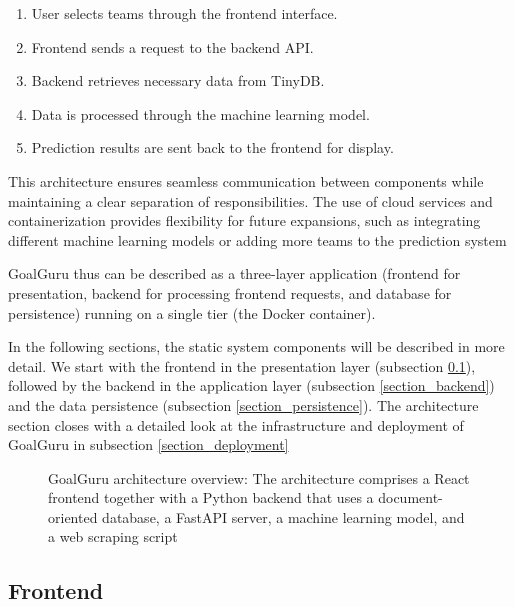 \documentclass[conference,a4paper,flushend]{cs-techrep}
\begin{document}
\begin{enumerate}
\item User selects teams through the frontend interface.
\item Frontend sends a request to the backend API.
\item Backend retrieves necessary data from TinyDB.
\item Data is processed through the machine learning model.
\item Prediction results are sent back to the frontend for display.
\end{enumerate}

This architecture ensures seamless communication between components while maintaining a clear separation of responsibilities. The use of cloud services and containerization provides flexibility for future expansions, such as integrating different machine learning models or adding more teams to the prediction system

GoalGuru thus can be described as a three-layer application (frontend for presentation, backend for processing frontend requests, and database for persistence) running on a single tier (the Docker container). 

In the following sections, the static system components will be described in more detail. We start with the frontend in the presentation layer (subsection \ref{section_frontend}), followed by the backend in the application layer (subsection \ref{section_backend}) and the data persistence (subsection \ref{section_persistence}). The architecture section closes with a detailed look at the infrastructure and deployment of GoalGuru in subsection \ref{section_deployment}

\begin{figure}[ht]
\centering

\caption{GoalGuru architecture overview: The architecture comprises a React frontend together with a Python backend that uses a document-oriented database, a FastAPI server, a machine learning model, and a web scraping script}
\label{awsarchitecture}
\end{figure}



\subsection{Frontend} \label{section_frontend}
\end{document}
